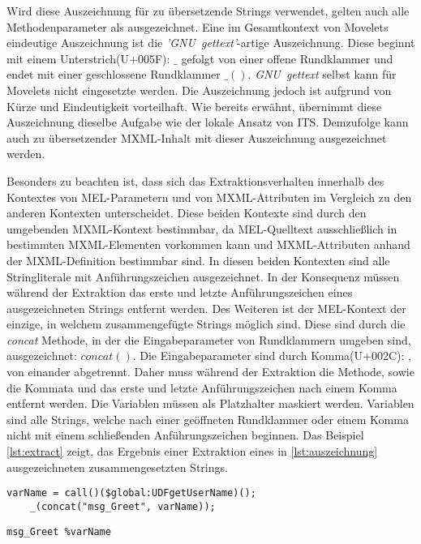 \autocite[Vgl.][]{Nitschkowski.2018h}
Wird diese Auszeichnung für zu übersetzende Strings verwendet, gelten auch alle Methodenparameter als ausgezeichnet. Eine im Gesamtkontext von Movelets eindeutige Auszeichnung ist die \mbox{\textit{'GNU gettext'}}-artige Auszeichnung. Diese beginnt mit einem Unterstrich(U+005F): $\_$ gefolgt von einer offene Rundklammer und endet mit einer geschlossene Rundklammer $\_()$. \mbox{\textit{GNU gettext}} selbst kann für Movelets nicht eingesetzte werden.
\autocite[Vgl.][]{GNU.}
Die Auszeichnung jedoch ist aufgrund von Kürze und Eindeutigkeit vorteilhaft. Wie bereits erwähnt, übernimmt diese Auszeichnung dieselbe Aufgabe wie der lokale Ansatz von \ac{ITS}. Demzufolge kann auch zu übersetzender \ac{MXML}-Inhalt mit dieser Auszeichnung ausgezeichnet werden.
\par
Besonders zu beachten ist, dass sich das Extraktionsverhalten innerhalb des Kontextes von \ac{MEL}-Parametern und von \ac{MXML}-Attributen im Vergleich zu den anderen Kontexten unterscheidet. Diese beiden Kontexte sind durch den umgebenden \ac{MXML}-Kontext bestimmbar, da \ac{MEL}-Quelltext ausschließlich in bestimmten \ac{MXML}-Elementen vorkommen kann und \ac{MXML}-Attributen anhand der \ac{MXML}-Definition bestimmbar sind.
\autocite[Vgl.][]{Nitschkowski.2015b}
In diesen beiden Kontexten sind alle Stringliterale mit Anführungszeichen ausgezeichnet.
\autocite[Vgl.][]{Bray.2008}
\autocite[Vgl.][]{Nitschkowski.2018g}
In der Konsequenz müssen während der Extraktion das erste und letzte Anführungszeichen eines ausgezeichneten Strings entfernt werden. Des Weiteren ist der \ac{MEL}-Kontext der einzige, in welchem zusammengefügte Strings möglich sind. Diese sind durch die \mbox{\textit{concat}} Methode, in der die Eingabeparameter von Rundklammern umgeben sind, ausgezeichnet: \mbox{$concat()$}. Die Eingabeparameter sind durch Komma(U+002C): $,$ von einander abgetrennt.
\autocite[Vgl.][]{Nitschkowski.2018f}
Daher muss während der Extraktion die Methode, sowie die Kommata und das erste und letzte Anführungszeichen nach einem Komma entfernt werden. Die Variablen müssen als Platzhalter maskiert werden. Variablen sind alle Strings, welche nach einer geöffneten Rundklammer oder einem Komma nicht mit einem schließenden Anführungszeichen beginnen. Das Beispiel \ref{lst:extract} zeigt, das Ergebnis einer Extraktion eines in \ref{lst:auszeichnung} ausgezeichneten zusammengesetzten Strings.
\begin{lstlisting}[caption={Ausgezeichneter zusammengesetzter String}, label={lst:auszeichnung}]
	varName = call()($global:UDFgetUserName)();
	_(concat("msg_Greet", varName));
\end{lstlisting}
\begin{lstlisting}[caption={Extrahierter zusammengesetzter String},
	label={lst:extract}]
	msg_Greet %varName
\end{lstlisting}
